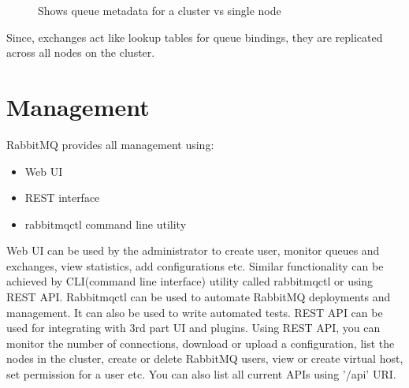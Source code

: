 \documentclass[9pt,twocolumn,twoside]{../../styles/osajnl}
\begin{document}
\begin{figure}[htbp]
\centering
{}
\caption{Shows queue metadata for a cluster vs single node \cite{videla2012rabbitmq}}
\label{fig:false-color}
\end{figure}

Since, exchanges act like lookup tables for queue bindings, they are replicated
across all nodes on the cluster. 

\section{Management}
RabbitMQ provides all management using:
\begin{itemize}
	\item Web UI 
	\item REST interface
	\item rabbitmqctl command line utility
\end{itemize}

Web UI can be used by the administrator to create user, monitor queues and
exchanges, view statistics, add configurations etc. Similar functionality can be
achieved by CLI(command line interface) utility called rabbitmqctl or using REST
API. Rabbitmqctl can be used to automate RabbitMQ deployments and management. It
can also be used to write automated tests. REST API can be used for integrating
with 3rd part UI and plugins.  Using REST API, you can monitor the number of
connections, download or upload a configuration, list the nodes in the cluster,
create or delete RabbitMQ users, view or create virtual host, set permission for
a user etc. You can also list all current APIs using '/api' URI.
\end{document}
